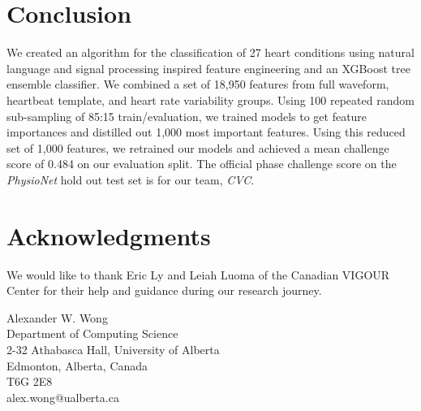 \documentclass[twocolumn]{cinc}
\begin{document}
\section{Conclusion}

We created an algorithm for the classification of 27 heart conditions using natural language and signal processing inspired feature engineering and an XGBoost tree ensemble classifier.
We combined a set of 18,950 features from full waveform, heartbeat template, and heart rate variability groups.
Using 100 repeated random sub-sampling of 85:15 train/evaluation, we trained models to get feature importances and distilled out 1,000 most important features.
Using this reduced set of 1,000 features, we retrained our models and achieved a mean challenge score of 0.484 on our evaluation split.
The official phase challenge score on the \emph{PhysioNet} hold out test set is \officialscore for our team, \emph{CVC}.


\section*{Acknowledgments}
We would like to thank Eric Ly and Leiah Luoma of the Canadian VIGOUR Center for their help and guidance during our research journey.



\begin{correspondence}
Alexander W. Wong\\
Department of Computing Science\\
2-32 Athabasca Hall, University of Alberta\\
Edmonton, Alberta, Canada\\
T6G 2E8\\
alex.wong@ualberta.ca
\end{correspondence}
\end{document}
